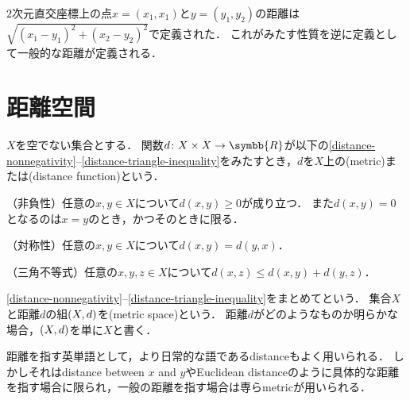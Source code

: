 \documentclass{ltjsbook}
\begin{document}

\nocite{uchida}
\nocite{introduction-to-topology}


\(2\)次元直交座標上の点\(x = (x_1, x_1)\)と\(y = (y_1, y_2)\)の距離は\(\sqrt{(x_1 - y_1)^2 + (x_2 - y_2)^2}\)で定義された．
これがみたす性質を逆に定義として一般的な距離が定義される．

\section{距離空間}
\begin{thmbox}
\begin{definition}
\(X\)を空でない集合とする．
関数\(d\colon X \times X \to \symbb{R}\)が以下の\ref{distance-nonnegativity}--\ref{distance-triangle-inequality}をみたすとき，\(d\)を\(X\)上の(metric)または(distance function)という．
\begin{conditions}
    \item\label{distance-nonnegativity} （非負性）任意の\(x, y \in X\)について\(d(x, y) \geq 0\)が成り立つ．
        また\(d(x, y) = 0\)となるのは\(x = y\)のとき，かつそのときに限る．
    \item\label{distance-symmetry} （対称性）任意の\(x, y \in X\)について\(d(x, y) = d(y, x)\)．
    \item\label{distance-triangle-inequality} （三角不等式）任意の\(x, y, z \in X\)について\(d(x, z) \leq d(x, y) + d(y, z)\)．
\end{conditions}
\ref{distance-nonnegativity}--\ref{distance-triangle-inequality}をまとめてという．
集合\(X\)と距離\(d\)の組\((X, d)\)を(metric space)という．
距離\(d\)がどのようなものか明らかな場合，\((X, d)\)を単に\(X\)と書く．
\end{definition}
\end{thmbox}

距離を指す英単語として，より日常的な語であるdistanceもよく用いられる．
しかしそれはdistance between \(x\) and \(y\)やEuclidean distanceのように具体的な距離を指す場合に限られ，一般の距離を指す場合は専らmetricが用いられる．
\end{document}
